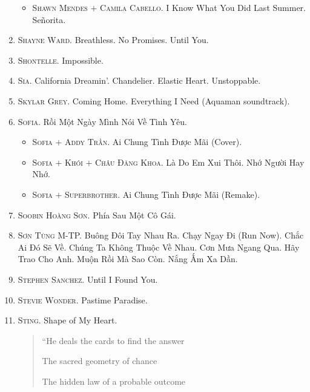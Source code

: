 \documentclass{article}
\begin{document}
\begin{enumerate}
	\begin{itemize}
		\item \textsc{Shawn Mendes $+$ Camila Cabello.} I Know What You Did Last Summer. Se\~norita.
	\end{itemize}
	\item \textsc{Shayne Ward.} Breathless. No Promises. Until You.
	\item \textsc{Shontelle.} Impossible.
	\item \textsc{Sia.} California Dreamin'. Chandelier. Elastic Heart. Unstoppable.
	\item \textsc{Skylar Grey.} Coming Home. Everything I Need (Aquaman soundtrack).
	\item \textsc{Sofia.} Rồi Một Ngày Mình Nói Về Tình Yêu.
	\begin{itemize}
		\item \textsc{Sofia $+$ Addy Trần.} Ai Chung Tình Được Mãi (Cover).
		\item \textsc{Sofia $+$ Khói $+$ Châu Đăng Khoa.} Là Do Em Xui Thôi. Nhớ Người Hay Nhớ.
		\item \textsc{Sofia $+$ Superbrother.} Ai Chung Tình Được Mãi (Remake).
	\end{itemize}
	\item \textsc{Soobin Hoàng Sơn.} Phía Sau Một Cô Gái.
	\item \textsc{Sơn Tùng M-TP.} Buông Đôi Tay Nhau Ra. Chạy Ngay Đi (Run Now). Chắc Ai Đó Sẽ Về. Chúng Ta Không Thuộc Về Nhau. Cơn Mưa Ngang Qua. Hãy Trao Cho Anh. Muộn Rồi Mà Sao Còn. Nắng Ấm Xa Dần.
	\item \textsc{Stephen Sanchez.} Until I Found You.
	\item \textsc{Stevie Wonder.} Pastime Paradise.
	\item \textsc{Sting.} Shape of My Heart.
	\begin{quotation}
		``He deals the cards to find the answer
		
		The sacred geometry of chance
		
		The hidden law of a probable outcome
		

\end{quotation}
\end{enumerate}
\end{document}
